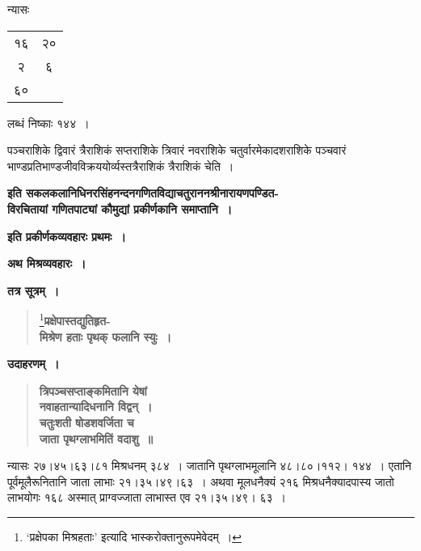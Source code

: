 \documentclass[11pt, openany]{book}
\begin{document}
\begin{sloppypar}
न्यासः \begin{tabular}{c|c}
१६ & २० \\
२ & ६ \\
६० & 
\end{tabular} लब्धं निष्काः १४४~।\\
\vspace{2mm}

पञ्चराशिके द्विवारं त्रैराशिकं सप्तराशिके त्रिवारं नवराशिके चतुर्वारमेकादशराशिके पञ्चवारं भाण्डप्रतिभाण्डजीवविक्रययोर्व्यस्तत्रैराशिकं त्रैराशिकं चेति~।

\begin{center}
\textbf{इति सकलकलानिधिनरसिंहनन्दनगणितविद्याचतुराननश्रीनारायणपण्डित-\\
विरचितायां गणितपाट्यां कौमुद्यां प्रकीर्णकानि समाप्तानि~।}
\vspace{4mm}

\textbf{इति प्रकीर्णकव्यवहारः प्रथमः~।}
\end{center}
\vspace{4mm}

{\Large \textbf{अथ मिश्रव्यवहारः~।}}
\vspace{4mm}

\noindent \textbf{तत्र सूत्रम्~।}

 \label{2.1.1}
\begin{quote}
\renewcommand{\thefootnote}{$\star$}\footnote{{\color{violet}`प्रक्षेपका मिश्रहताः'} इत्यादि {\color{violet}भास्करो}क्तानुरूपमेवेदम्~।}{\large \textbf{{\color{purple}प्रक्षेपास्तद्युतिहृत-\\
मिश्रेण हताः पृथक् फलानि स्युः~।}}}
\end{quote}

\noindent \textbf{उदाहरणम्~।}

 \label{Ex 2.1}
\begin{quote}
\textbf{{\color{red}त्रिपञ्चसप्ताङ्कमितानि येषां \\
नवाहतान्यादिधनानि विद्वन्~।\\
चतुःशती षोडशवर्जिता च \\
जाता पृथग्लाभमितिं वदाशु~॥}}
\end{quote}

न्यासः २७।४५।६३।८१ मिश्रधनम् ३८४~। जातानि पृथग्लाभमूलानि ४८।८०।११२। १४४~। एतानि पूर्वमूलैरूनितानि जाता लाभाः २१।३५।४९।६३~। अथवा मूलधनैक्यं २१६ मिश्रधनैक्यादपास्य जातो लाभयोगः १६८ अस्मात् प्राग्वज्जाता लाभास्त एव २१।३५।४९। ६३~।
\end{sloppypar}
\end{document}
